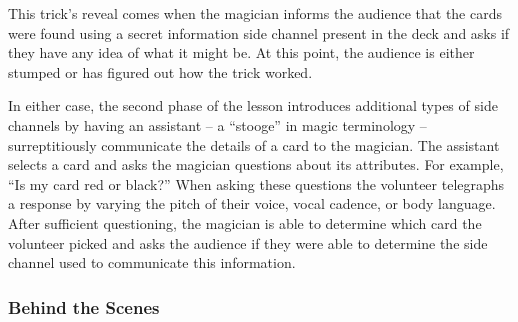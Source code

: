 This trick's reveal comes when the magician informs the audience
that the cards were found using a secret
information side channel present in the
deck and asks if they have any idea of what it might be.
At this point, the audience is either stumped or has figured out how the trick
worked.

In either case,  the second phase of the lesson
introduces additional types of side channels
by having an assistant
-- a ``stooge'' in magic terminology --
surreptitiously
communicate the details of a card
to the magician.
The assistant selects a card and asks the magician questions about its
attributes.
For example, ``Is my card red or black?''
When asking these questions the volunteer
telegraphs a response
by varying the pitch of their voice, vocal cadence, or body language.
After sufficient questioning, the magician is able to determine which card the
volunteer picked and asks the audience if they were able to determine the side
channel used to communicate this information.

\subsubsection{Behind the Scenes}

